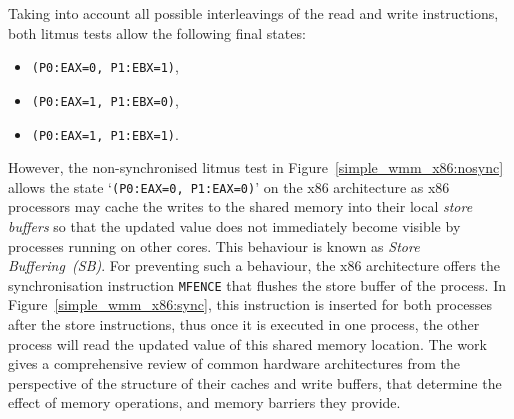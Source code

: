 Taking into account all possible interleavings of the read and write instructions, both litmus tests allow the following final states:
\begin{itemize}[noitemsep,topsep=0pt]
\item \texttt{(P0:EAX=0,~P1:EBX=1)},
\item \texttt{(P0:EAX=1,~P1:EBX=0)},
\item \texttt{(P0:EAX=1,~P1:EBX=1)}.
\end{itemize}
However, the non-synchronised litmus test in Figure~\ref{simple_wmm_x86:nosync} allows the state `\texttt{(P0:EAX=0,~P1:EAX=0)}' on the x86 architecture as x86 processors may cache the writes to the shared memory into their local \textit{store buffers} so that the updated value does not immediately become visible by processes running on other cores.
This behaviour is known as \textit{Store Buffering~(SB)}.
For preventing such a behaviour, the x86 architecture offers the synchronisation instruction \texttt{MFENCE} that flushes the store buffer of the process.
In Figure~\ref{simple_wmm_x86:sync}, this instruction is inserted for both processes after the store instructions, thus once it is executed in one process, the other process will read the updated value of this shared memory location.
The work~\cite{mckenney2010memory} gives a comprehensive review of common hardware architectures from the perspective of the structure of their caches and write buffers, that determine the effect of memory operations, and memory barriers they provide.



